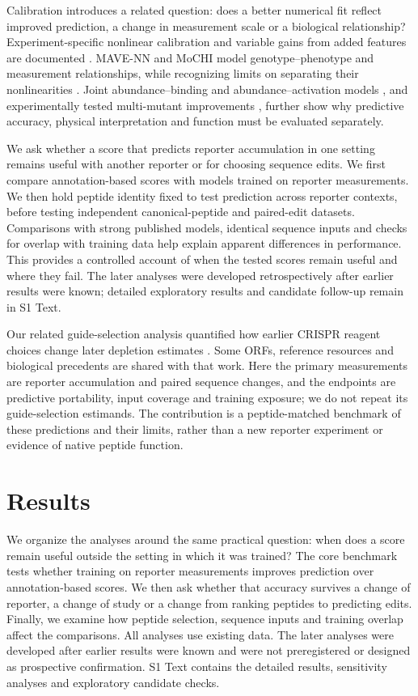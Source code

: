 \documentclass[11pt,a4paper]{article}
\begin{document}
Calibration introduces a related question: does a better numerical fit
reflect improved prediction, a change in measurement scale or a biological
relationship? Experiment-specific nonlinear calibration and variable gains
from added features are documented \cite{schulze}. MAVE-NN and MoCHI model
genotype--phenotype and measurement relationships, while recognizing limits
on separating their nonlinearities \cite{mavenn,mochi}. Joint
abundance--binding and abundance--activation models
\cite{faureenergetic,leblancactivation}, and experimentally tested
multi-mutant improvements \cite{gmma}, further show why predictive accuracy,
physical interpretation and function must be evaluated separately.

We ask whether a score that predicts reporter accumulation in one setting
remains useful with another reporter or for choosing sequence edits. We
first compare annotation-based scores with models trained on reporter
measurements. We then hold peptide identity fixed to test prediction across
reporter contexts, before testing independent canonical-peptide and
paired-edit datasets. Comparisons with strong published models, identical
sequence inputs and checks for overlap with training data help explain
apparent differences in performance. This provides a controlled account of
when the tested scores remain useful and where they fail. The later
analyses were developed retrospectively after earlier results were known;
detailed exploratory results and candidate follow-up remain in S1 Text.

Our related guide-selection analysis quantified how earlier CRISPR
reagent choices change later depletion estimates \cite{guideselection}.
Some ORFs, reference resources and biological precedents are shared with
that work. Here the primary measurements are reporter accumulation and
paired sequence changes, and the endpoints are predictive portability,
input coverage and training exposure; we do not repeat its guide-selection
estimands. The contribution is a peptide-matched benchmark of these
predictions and their limits, rather than a new reporter experiment or
evidence of native peptide function.

\section{Results}
We organize the analyses around the same practical question: when does
a score remain useful outside the setting in which it was trained? The core
benchmark tests whether training on reporter measurements improves prediction
over annotation-based scores. We then ask whether that accuracy survives a
change of reporter, a change of study or a change from ranking peptides to
predicting edits. Finally, we examine how peptide selection, sequence inputs
and training overlap affect the comparisons. All analyses use existing data.
The later analyses were developed after earlier results were known and were
not preregistered or designed as prospective confirmation. S1 Text contains
the detailed results, sensitivity analyses and exploratory candidate checks.
\end{document}
